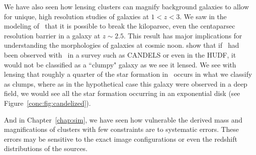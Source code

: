 We have also seen how lensing clusters can magnify background galaxies to allow for unique, high resolution studies of galaxies at $1<z<3$. We saw in the modeling of \cluster\ that it is possible to break the kiloparsec, even the centaparsec resolution barrier in a galaxy at $z\sim2.5$. This result has major implications for understanding the morphologies of galaxies at cosmic noon. \citet{Rigby:2017qy} show that if \giantarc\ had been observed with \hst\ in a survey such as CANDELS or even in the HUDF, it would not be classified as a ``clumpy" galaxy as we see it lensed. We see with lensing that roughly a quarter of the star formation in \giantarc\ occurs in what we classify as clumps, where as in the hypothetical case this galaxy were observed in a deep field, we would see all the star formation occurring in an exponential disk (see Figure~\ref{conc:fig:candelized}).

And in Chapter~\ref{chap:sim}, we have seen how vulnerable the derived mass and magnifications of clusters with few constraints are to systematic errors. These errors may be sensitive to the exact image configurations or even the redshift distributions of the sources.

